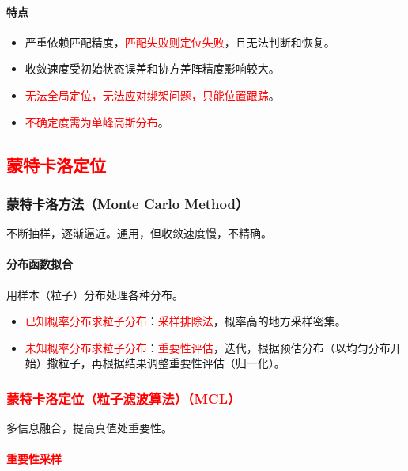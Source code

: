 \documentclass[
12pt, %
a4paper, 
oneside, %
]{scrartcl}
\begin{document}
\paragraph{特点}
\begin{itemize}
\item 严重依赖匹配精度，\textcolor{red}{匹配失败则定位失败}，且无法判断和恢复。
\item 收敛速度受初始状态误差和协方差阵精度影响较大。
\item \textcolor{red}{无法全局定位，无法应对绑架问题，只能位置跟踪}。
\item \textcolor{red}{不确定度需为单峰高斯分布}。
\end{itemize}
\subsection[蒙特卡洛定位]{\textcolor{red}{蒙特卡洛定位}}
\subsubsection[蒙特卡洛方法]{蒙特卡洛方法（Monte Carlo Method）}
不断抽样，逐渐逼近。通用，但收敛速度慢，不精确。
\paragraph{分布函数拟合}
用样本（粒子）分布处理各种分布。
\begin{itemize}
\item \textcolor{red}{已知概率分布求粒子分布}：\textcolor{red}{采样排除法}，概率高的地方采样密集。
\item \textcolor{red}{未知概率分布求粒子分布}：\textcolor{red}{重要性评估}，迭代，根据预估分布（以均匀分布开始）撒粒子，再根据结果调整重要性评估（归一化）。
\end{itemize}
\subsubsection[蒙特卡洛定位（粒子滤波）算法]{\textcolor{red}{蒙特卡洛定位（粒子滤波算法）（MCL）}}
多信息融合，提高真值处重要性。
\paragraph{\textcolor{red}{重要性采样}}~\\
\end{document}
